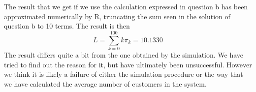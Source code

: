 \documentclass[11pt, a4paper]{article}
\begin{document}
The result that we get if we use the calculation expressed in question b has been approximated numerically by R, truncating the sum seen in the solution of question b to 10 terms. The result is then
\[
	L = \sum_{k = 0}^{100} k \pi_k = 10.1330
\]
The result differs quite a bit from the one obtained by the simulation. We have tried to find out the reason for it, but have ultimately been unsuccessful. 
However we think it is likely a failure of either the simulation procedure or the way that we have calculated the average number of customers in the system.
\end{document}
